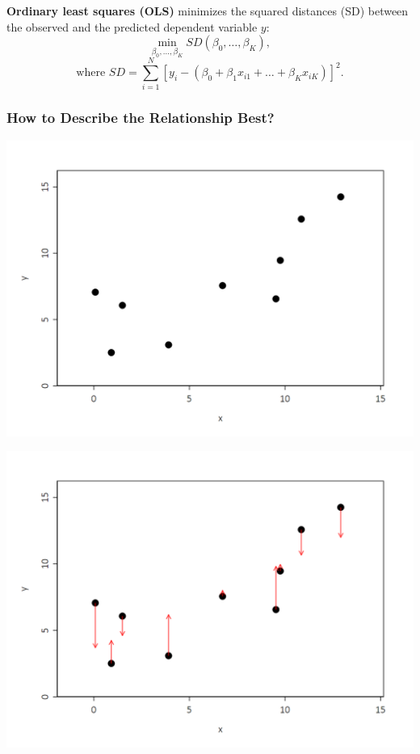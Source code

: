 \documentclass[a4paper,12pt]{article}
\begin{document}
\textbf{Ordinary least squares (OLS)} minimizes the squared distances (SD) between the observed and the predicted dependent variable $y$:
$$\min_{\beta_0,\ldots,\beta_K}{SD(\beta_0,\ldots,\beta_K)},$$
$$\text{where } SD=\sum^{N}_{i=1}{[y_i-(\beta_0+\beta_1x_{i1}+\ldots+\beta_Kx_{iK})]^2}.$$



\subsubsection*{How to Describe the Relationship Best?}
    \begin{center}
\includegraphics[width=.9\textwidth]{figures/OLS1}
     \end{center}

\clearpage


    \begin{center}
\includegraphics[width=.9\textwidth]{figures/OLS2}
     \end{center}
\end{document}
